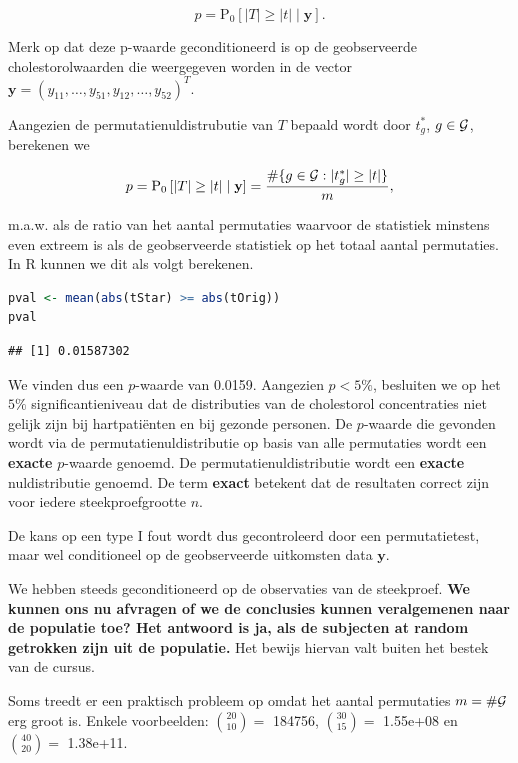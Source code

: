 \documentclass[
  12pt,dutch,coursenotes]{book}
\theoremstyle{definition}
\theoremstyle{definition}
\theoremstyle{definition}
\theoremstyle{definition}
\theoremstyle{remark}
\begin{document}
\[p=\text{P}_0\left[\vert T\vert \geq \vert t\vert \mid \mathbf{y}\right].\]

Merk op dat deze p-waarde geconditioneerd is op de geobserveerde cholestorolwaarden die weergegeven worden in de vector \(\mathbf{y}=(y_{11},\ldots,y_{51},y_{12},\ldots,y_{52})^T\).

Aangezien de permutatienuldistrubutie van \(T\) bepaald wordt door \(t^*_g\), \(g \in{\cal{G}}\), berekenen we

\[p  = \text{P}_0\left[\left\vert T\right\vert \geq \left\vert t\right\vert \mid \mathbf{y}\right] = \frac{\#\{g\in {\cal{G}}: \vert t^*_g\vert \geq \vert t \vert \}}{m},\]

m.a.w. als de ratio van het aantal permutaties waarvoor de statistiek minstens even extreem is als de geobserveerde statistiek op het totaal aantal permutaties. In R kunnen we dit als volgt berekenen.

\begin{lstlisting}[language=R]
pval <- mean(abs(tStar) >= abs(tOrig))
pval
\end{lstlisting}

\begin{lstlisting}
## [1] 0.01587302
\end{lstlisting}

We vinden dus een \(p\)-waarde van 0.0159. Aangezien \(p<5\%\), besluiten we op het \(5\%\) significantieniveau dat de distributies van de cholestorol concentraties niet gelijk zijn bij hartpatiënten en bij gezonde personen.
De \(p\)-waarde die gevonden wordt via de permutatienuldistributie op basis van alle permutaties wordt een \textbf{exacte} \(p\)-waarde genoemd. De permutatienuldistributie wordt een \textbf{exacte} nuldistributie genoemd. De term \textbf{exact} betekent dat de resultaten correct zijn voor iedere steekproefgrootte \(n\).

De kans op een type I fout wordt dus gecontroleerd door een permutatietest, maar wel conditioneel op de geobserveerde uitkomsten data \(\mathbf{y}\).

We hebben steeds geconditioneerd op de observaties van de steekproef. \textbf{We kunnen ons nu afvragen of we de conclusies kunnen veralgemenen naar de populatie toe? Het antwoord is ja, als de subjecten at random getrokken zijn uit de populatie.} Het bewijs hiervan valt buiten het bestek van de cursus.

Soms treedt er een praktisch probleem op omdat het aantal permutaties \(m=\#{\cal{G}}\) erg groot is. Enkele voorbeelden:
\(\binom{20}{10}=\) 184756, \(\binom{30}{15}=\) 1.55e+08 en \(\binom{40}{20}=\) 1.38e+11.
\end{document}
